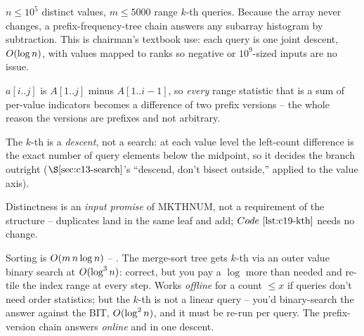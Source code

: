 \(n\le10^5\) distinct values, \(m\le5000\) range \(k\)-th queries. Because the array never changes, a prefix-frequency-tree chain answers any subarray histogram by subtraction. This is chairman's textbook use: each query is one joint descent, \(O(\log n)\), with values mapped to ranks so negative or \(10^9\)-sized inputs are no issue.

\begin{observation}
\(a[i..j]\) is \(A[1..j]\) minus \(A[1..i-1]\), so \emph{every} range statistic that is a sum of per-value indicators becomes a difference of two prefix versions -- the whole reason the versions are prefixes and not arbitrary.
\end{observation}
\begin{observation}
The \(k\)-th is a \emph{descent}, not a search: at each value level the left-count difference is the exact number of query elements below the midpoint, so it decides the branch outright (\(\secref{c13-search}\)'s ``descend, don't bisect outside,'' applied to the value axis).
\end{observation}
\begin{observation}
Distinctness is an \emph{input promise} of MKTHNUM, not a requirement of the structure -- duplicates land in the same leaf and add; \(\coderef{c19-kth}\) needs no change.
\end{observation}

\begin{thinkbox}
{Sorting is \(O(m\,n\log n)\) -- \tle. The merge-sort tree gets \(k\)-th via an outer value binary search at \(O(\log^3 n)\): correct, but you pay a \(\log\) more than needed and re-tile the index range at every step.}
{Works \emph{offline} for a count \(\le x\) if queries don't need order statistics; but the \(k\)-th is not a linear query -- you'd binary-search the answer against the BIT, \(O(\log^2 n)\), and it must be re-run per query. The prefix-version chain answers \emph{online} and in one descent.}
\end{thinkbox}

